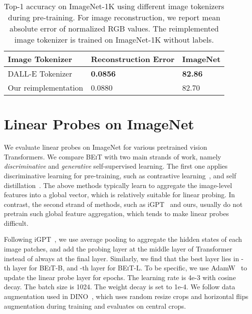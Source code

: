 \documentclass{article}
\newcommand\our{\textsc{BEiT}}
\begin{document}
\begin{table}[H]
\centering
\begin{tabular}{lll}
\toprule
\bf Image Tokenizer & \bf Reconstruction Error & \bf ImageNet\\
\midrule
DALL-E Tokenizer~\citep{dalle} & \bf 0.0856 & \bf 82.86 \\
Our reimplementation & 0.0880 & 82.70 \\
\bottomrule
\end{tabular}
\caption{
Top-1 accuracy on ImageNet-1K using different image tokenizers during pre-training. For image reconstruction, we report mean absolute error of normalized RGB values. The reimplemented image tokenizer is trained on ImageNet-1K without labels.
}
\label{tbl:image_tokenizer_ablation}
\end{table}


\section{Linear Probes on ImageNet}
\label{app:linear_prob}

We evaluate linear probes on ImageNet for various pretrained vision Transformers.
We compare \our{} with two main strands of work, namely \textit{discriminative} and \textit{generative} self-supervised learning.
The first one applies discriminative learning for pre-training, such as contrastive learning~\citep{mocov3}, and self distillation~\citep{dino}.
The above methods typically learn to aggregate the image-level features into a global vector, which is relatively suitable for linear probing.
In contrast, the second strand of methods, such as iGPT~\citep{igpt} and ours, usually do not pretrain such global feature aggregation, which tends to make linear probes difficult.

Following iGPT~\citep{igpt}, we use average pooling to aggregate the hidden states of each image patches, and add the probing layer at the middle layer of Transformer instead of always at the final layer.
Similarly, we find that the best layer lies in -th layer for \our{}-B, and -th layer for \our{}-L.
To be specific, we use AdamW~\citep{adamw} to update the linear probe layer for  epochs. The learning rate is 4e-3 with cosine decay. The batch size is 1024. The weight decay is set to 1e-4.
We follow data augmentation used in DINO~\citep{dino}, which uses random resize crops and horizontal flips augmentation during training and evaluates on central crops.
\end{document}
